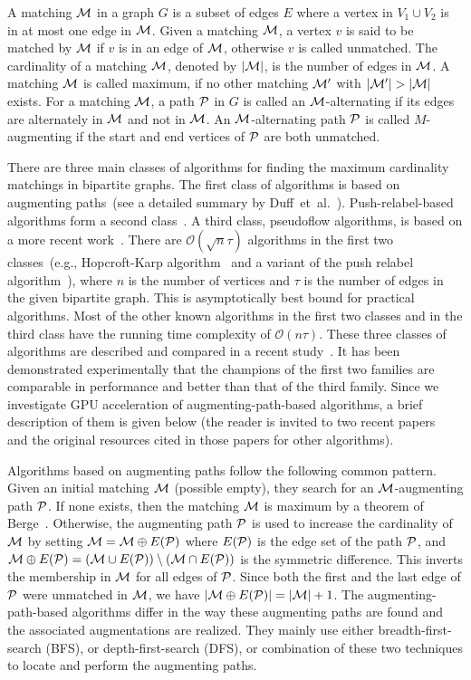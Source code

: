 \documentclass[11pt,a4paper]{article}
\newcommand{\Ma}{{\cal M}}
\newcommand{\Pa}{{\cal P}}
\begin{document}
A matching $\Ma$ in a graph $G$ is a subset of edges $E$ where a vertex in $V_1\cup V_2$ is in at most 
one edge in $\Ma$. 
Given a matching $\Ma$, a vertex $v$ is said to be matched by $\Ma$ if $v$ is in an edge of $\Ma$, otherwise $v$ is called unmatched.
The cardinality of a matching $\Ma$, denoted by $|\Ma|$, is the number of edges in $\Ma$. 
A matching $\Ma$ is called maximum, if no other matching $\Ma'$ with $|\Ma'|>|\Ma|$ exists.
For a matching $\Ma$, a path $\Pa$ in $G$ is called an $\Ma$-alternating if its edges are alternately in $\Ma$ and not in $\Ma$.
An $\Ma$-alternating path $\Pa$ is called $M$-augmenting if the start and end vertices of $\Pa$ are both unmatched.

There are three main classes of algorithms for finding the maximum
cardinality matchings in bipartite graphs. 
The first class of algorithms is based on augmenting paths~(see a detailed summary by Duff~et~al.~\cite{duff2011design}).
Push-relabel-based algorithms form a second class~\cite{Goldberg}. 
A third class, pseudoflow algorithms, is based on a more recent work~\cite{Hochbaum_pseudo}.
There are $\mathcal{O}(\sqrt{n}\tau)$ algorithms in the first two classes~(e.g., Hopcroft-Karp algorithm~\cite{hopcroft1973n} and a variant of the push relabel algorithm~\cite{goke:97}), where $n$ is the number of vertices and $\tau$ is the number of edges in the given bipartite graph.
This is asymptotically best bound for practical algorithms.
Most of the other known algorithms in the first two classes and in the third class have the running time complexity of  $\mathcal{O}(n\tau)$. 
These three classes of algorithms are described and compared in a recent study~\cite{klmu:12j}.
It has been demonstrated experimentally that the champions of the first two families 
are comparable in performance and better than that of the third family.
Since we investigate GPU acceleration of augmenting-path-based algorithms, a brief description of them is given below (the reader is invited to two
recent papers~\cite{duff2011design,klmu:12j} and the original resources cited in those papers for other algorithms).

Algorithms based on augmenting paths follow the following common pattern. Given an initial matching $\Ma$ (possible empty), they search for an $\Ma$-augmenting
path $\Pa$. If none exists, then the
matching $\Ma$ is maximum by a theorem of Berge~\cite{berg:57}. 
Otherwise, the augmenting path $\Pa$ is used to
increase the cardinality of $\Ma$ by setting $\Ma = \Ma \oplus E(\Pa)$
where $E(\Pa)$ is the edge set of the path $\Pa$, and $\Ma \oplus E(\Pa) = (\Ma \cup E(\Pa)) \setminus (\Ma \cap E(\Pa))$ is the symmetric difference. This inverts the membership in $\Ma$ for all edges
of $\Pa$. Since both the first and the last edge of $\Pa$ were unmatched in $\Ma$, we have
$|\Ma \oplus E(\Pa)|=|\Ma|+1$.
The augmenting-path-based algorithms differ in the way these augmenting paths are found and the associated augmentations are realized.
They mainly use either breadth-first-search (BFS), or depth-first-search (DFS), or combination 
of these two techniques to locate and perform the augmenting paths. 
\end{document}

